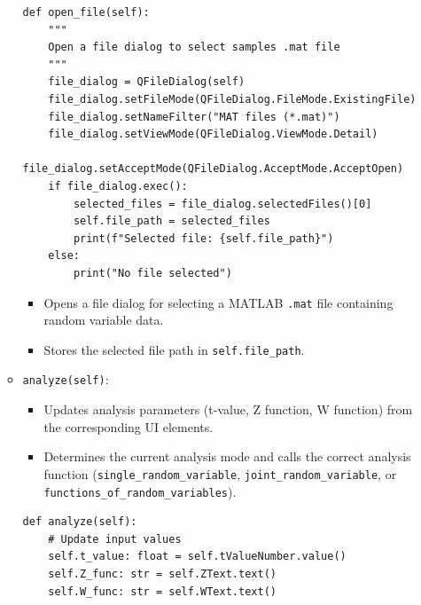 \documentclass{article}
\begin{document}
\begin{enumerate}
\begin{itemize}
               \begin{verbatim}
def open_file(self):
    """
    Open a file dialog to select samples .mat file
    """
    file_dialog = QFileDialog(self)
    file_dialog.setFileMode(QFileDialog.FileMode.ExistingFile)
    file_dialog.setNameFilter("MAT files (*.mat)")
    file_dialog.setViewMode(QFileDialog.ViewMode.Detail)
    file_dialog.setAcceptMode(QFileDialog.AcceptMode.AcceptOpen)
    if file_dialog.exec():
        selected_files = file_dialog.selectedFiles()[0]
        self.file_path = selected_files
        print(f"Selected file: {self.file_path}")
    else:
        print("No file selected")
               \end{verbatim}
             \begin{itemize}
                \item Opens a file dialog for selecting a MATLAB \texttt{.mat} file containing random variable data.
                \item Stores the selected file path in \texttt{self.file\_path}.
              \end{itemize}
            \item \texttt{analyze(self)}:
            \begin{itemize}
                \item Updates analysis parameters (t-value, Z function, W function) from the corresponding UI elements.
                \item Determines the current analysis mode and calls the correct analysis function (\texttt{single\_random\_variable}, \texttt{joint\_random\_variable}, or \texttt{functions\_of\_random\_variables}).
            \end{itemize}
            \begin{verbatim}
def analyze(self):
    # Update input values
    self.t_value: float = self.tValueNumber.value()
    self.Z_func: str = self.ZText.text()
    self.W_func: str = self.WText.text()


\end{verbatim}
\end{itemize}
\end{enumerate}
\end{document}
